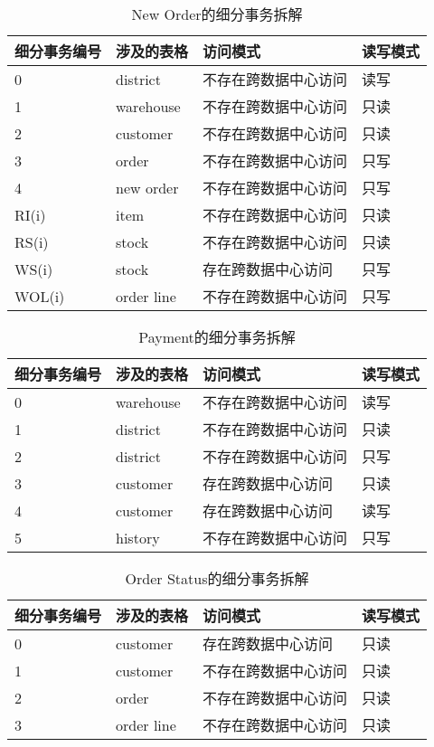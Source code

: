 \begin{table}[htb]
  \centering\small
  \caption{New Order的细分事务拆解}
  \label{tab:exampletable}
  \begin{tabular}{p{90pt}p{90pt}p{120pt}p{90pt}}
    \toprule
    细分事务编号   & 涉及的表格 & 访问模式 & 读写模式\\
    \midrule
    0 & district  & 不存在跨数据中心访问 &读写 \\
    1 & warehouse & 不存在跨数据中心访问 &只读\\
    2 & customer  & 不存在跨数据中心访问 &只读   \\
    3 & order     & 不存在跨数据中心访问 &只写 \\
    4 & new order & 不存在跨数据中心访问 &只写\\
    RI(i) & item  & 不存在跨数据中心访问 &只读\\
    RS(i) & stock & 不存在跨数据中心访问 &只读\\
    WS(i) & stock & 存在跨数据中心访问  &只写\\
    WOL(i)& order line & 不存在跨数据中心访问 &只写\\
    \bottomrule
  \end{tabular}
\end{table}


\begin{table}[htb]
  \centering\small
  \caption{Payment的细分事务拆解}
  \label{tab:exampletable}
  \begin{tabular}{p{90pt}p{90pt}p{120pt}p{90pt}}
    \toprule
    细分事务编号   & 涉及的表格 & 访问模式 & 读写模式\\
    \midrule
    0 & warehouse  & 不存在跨数据中心访问 &读写 \\
    1 & district   & 不存在跨数据中心访问 &只读\\
    2 & district   & 不存在跨数据中心访问 &只写   \\
    3 & customer   & 存在跨数据中心访问 &只读 \\
    4 & customer   & 存在跨数据中心访问 &读写\\
    5 & history    & 不存在跨数据中心访问 &只写\\
    \bottomrule
  \end{tabular}
\end{table}

\begin{table}[htb]
  \centering\small
  \caption{Order Status的细分事务拆解}
  \label{tab:exampletable}
  \begin{tabular}{p{90pt}p{90pt}p{120pt}p{90pt}}
    \toprule
    细分事务编号   & 涉及的表格 & 访问模式 & 读写模式\\
    \midrule
    0 & customer     & 存在跨数据中心访问 &只读 \\
    1 & customer     & 不存在跨数据中心访问 &只读\\
    2 & order        & 不存在跨数据中心访问 &只读   \\
    3 & order line   & 不存在跨数据中心访问 &只读 \\
    \bottomrule
  \end{tabular}
\end{table}

